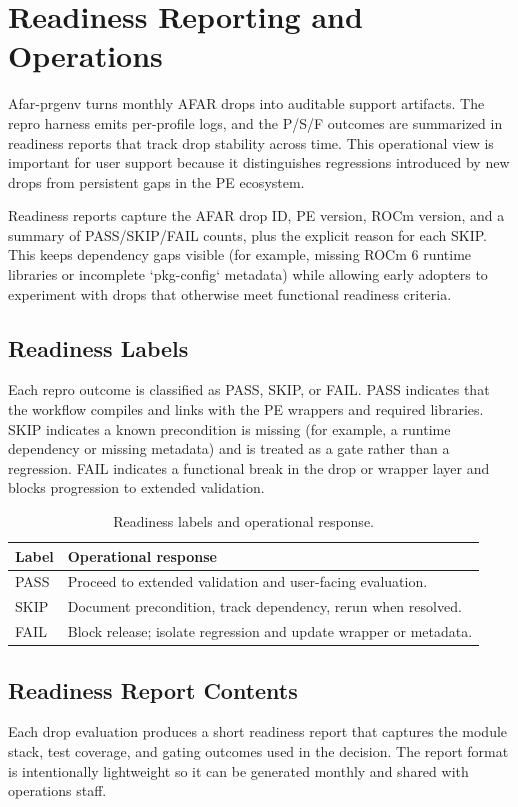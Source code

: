 \section{Readiness Reporting and Operations}
\label{sec:operations}
Afar-prgenv turns monthly AFAR drops into auditable support artifacts. The
repro harness emits per-profile logs, and the P/S/F outcomes are summarized in
readiness reports that track drop stability across time. This operational view
is important for user support because it distinguishes regressions introduced
by new drops from persistent gaps in the PE ecosystem.

Readiness reports capture the AFAR drop ID, PE version, ROCm version, and a
summary of PASS/SKIP/FAIL counts, plus the explicit reason for each SKIP. This
keeps dependency gaps visible (for example, missing ROCm 6 runtime libraries
or incomplete `pkg-config` metadata) while allowing early adopters to
experiment with drops that otherwise meet functional readiness criteria.

\subsection{Readiness Labels}
\label{sec:labels}
Each repro outcome is classified as PASS, SKIP, or FAIL. PASS indicates that
the workflow compiles and links with the PE wrappers and required libraries.
SKIP indicates a known precondition is missing (for example, a runtime
dependency or missing metadata) and is treated as a gate rather than a
regression. FAIL indicates a functional break in the drop or wrapper layer and
blocks progression to extended validation.

\begin{table}[t]
  \centering
  \small
  \setlength{\tabcolsep}{4pt}
  \caption{Readiness labels and operational response.}
  \label{tab:labels}
  \begin{tabular}{l p{}}
    \hline
    Label & Operational response \\
    \hline
    PASS & Proceed to extended validation and user-facing evaluation. \\
    SKIP & Document precondition, track dependency, rerun when resolved. \\
    FAIL & Block release; isolate regression and update wrapper or metadata. \\
    \hline
  \end{tabular}
\end{table}

\subsection{Readiness Report Contents}
\label{sec:report}
Each drop evaluation produces a short readiness report that captures the
module stack, test coverage, and gating outcomes used in the decision. The
report format is intentionally lightweight so it can be generated monthly and
shared with operations staff.

